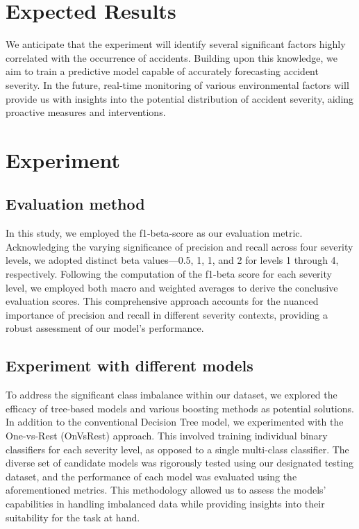 \documentclass[10pt,twocolumn,letterpaper]{article}
\begin{document}
\begin{CJK}{UTF8}{bsmi}
\section{Expected Results}
We anticipate that the experiment will identify several significant factors highly correlated with the occurrence of accidents. Building upon this knowledge, we aim to train a predictive model capable of accurately forecasting accident severity. In the future, real-time monitoring of various environmental factors will provide us with insights into the potential distribution of accident severity, aiding proactive measures and interventions.

\section{Experiment}

\subsection{Evaluation method}
In this study, we employed the f1-beta-score as our evaluation metric. Acknowledging the varying significance of precision and recall across four severity levels, we adopted distinct beta values—0.5, 1, 1, and 2 for levels 1 through 4, respectively. Following the computation of the f1-beta score for each severity level, we employed both macro and weighted averages to derive the conclusive evaluation scores. This comprehensive approach accounts for the nuanced importance of precision and recall in different severity contexts, providing a robust assessment of our model's performance.

\subsection{Experiment with different models}
To address the significant class imbalance within our dataset, we explored the efficacy of tree-based models and various boosting methods as potential solutions. In addition to the conventional Decision Tree model, we experimented with the One-vs-Rest (OnVsRest) approach. This involved training individual binary classifiers for each severity level, as opposed to a single multi-class classifier. The diverse set of candidate models was rigorously tested using our designated testing dataset, and the performance of each model was evaluated using the aforementioned metrics. This methodology allowed us to assess the models' capabilities in handling imbalanced data while providing insights into their suitability for the task at hand.


\end{CJK}
\end{document}
